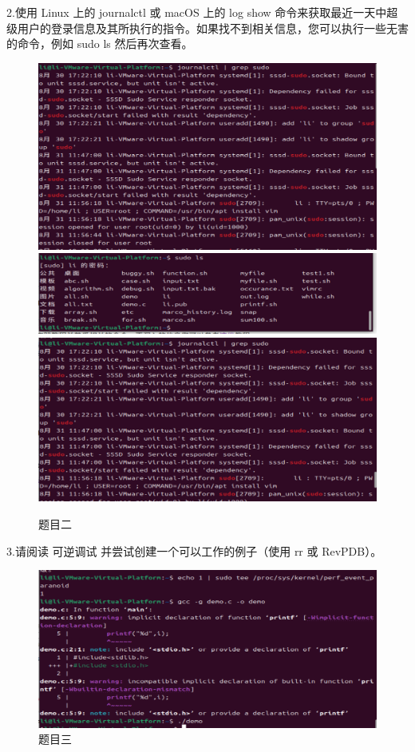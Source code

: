 \documentclass[a4paper, 12pt]{article}
\begin{document}
2.使用 Linux 上的 journalctl 或 macOS 上的 log show 命令来获取最近一天中超级用户的登录信息及其所执行的指令。如果找不到相关信息，您可以执行一些无害的命令，例如 sudo ls 然后再次查看。
\begin{figure}[H]
  \centering
  \includegraphics[width=\textwidth]{屏幕截图 2024-09-15 115738.png}
  \includegraphics[width=\textwidth]{屏幕截图 2024-09-15 115836.png}
  \includegraphics[width=\textwidth]{屏幕截图 2024-09-15 115913.png}
  \caption{题目二}
\end{figure}

3.请阅读 可逆调试 并尝试创建一个可以工作的例子（使用 rr 或 RevPDB）。
\begin{figure}[H]
  \centering
  \includegraphics[width=\textwidth]{屏幕截图 2024-09-15 120117.png}
  \caption{题目三}
\end{figure}
\end{document}
